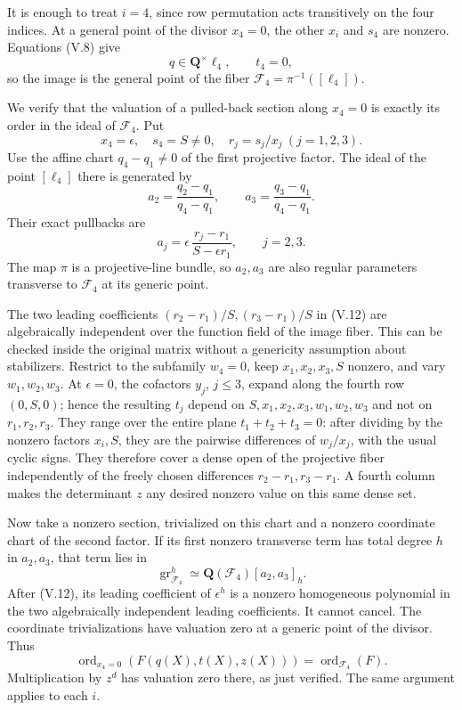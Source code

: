 \documentclass[
  10pt,
]{article}
\begin{document}
It is enough to treat \(i=4\), since row permutation acts transitively
on the four indices. At a general point of the divisor \(x_4=0\), the
other \(x_i\) and \(s_4\) are nonzero. Equations (V.8) give \[
q\in\mathbf Q^\times\ell_4,\qquad t_4=0,
\] so the image is the general point of the fiber
\(\mathcal F_4=\pi^{-1}([\ell_4])\).

We verify that the valuation of a pulled-back section along \(x_4=0\) is
exactly its order in the ideal of \(\mathcal F_4\). Put \[
x_4=\epsilon,\quad s_4=S\ne0,\quad r_j=s_j/x_j\ (j=1,2,3).
\] Use the affine chart \(q_4-q_1\ne0\) of the first projective factor.
The ideal of the point \([\ell_4]\) there is generated by \[
a_2=\frac{q_2-q_1}{q_4-q_1},\qquad
a_3=\frac{q_3-q_1}{q_4-q_1}.
\] Their exact pullbacks are \[
a_j=\epsilon\,\frac{r_j-r_1}{S-\epsilon r_1},
\qquad j=2,3.
\tag{V.12}
\] The map \(\pi\) is a projective-line bundle, so \(a_2,a_3\) are also
regular parameters transverse to \(\mathcal F_4\) at its generic point.

The two leading coefficients \((r_2-r_1)/S,(r_3-r_1)/S\) in (V.12) are
algebraically independent over the function field of the image fiber.
This can be checked inside the original matrix without a genericity
assumption about stabilizers. Restrict to the subfamily \(w_4=0\), keep
\(x_1,x_2,x_3,S\) nonzero, and vary \(w_1,w_2,w_3\). At \(\epsilon=0\),
the cofactors \(y_j\), \(j\le3\), expand along the fourth row
\((0,S,0)\); hence the resulting \(t_j\) depend on
\(S,x_1,x_2,x_3,w_1,w_2,w_3\) and not on \(r_1,r_2,r_3\). They range
over the entire plane \(t_1+t_2+t_3=0\): after dividing by the nonzero
factors \(x_i,S\), they are the pairwise differences of \(w_j/x_j\),
with the usual cyclic signs. They therefore cover a dense open of the
projective fiber independently of the freely chosen differences
\(r_2-r_1,r_3-r_1\). A fourth column makes the determinant \(z\) any
desired nonzero value on this same dense set.

Now take a nonzero section, trivialized on this chart and a nonzero
coordinate chart of the second factor. If its first nonzero transverse
term has total degree \(h\) in \(a_2,a_3\), that term lies in \[
\operatorname{gr}^h_{\mathcal F_4}\simeq
\mathbf Q(\mathcal F_4)[a_2,a_3]_h.
\] After (V.12), its leading coefficient of \(\epsilon^h\) is a nonzero
homogeneous polynomial in the two algebraically independent leading
coefficients. It cannot cancel. The coordinate trivializations have
valuation zero at a generic point of the divisor. Thus \[
\operatorname{ord}_{x_4=0}(F(q(X),t(X),z(X)))
=\operatorname{ord}_{\mathcal F_4}(F).
\tag{V.13}
\] Multiplication by \(z^d\) has valuation zero there, as just verified.
The same argument applies to each \(i\).
\end{document}
